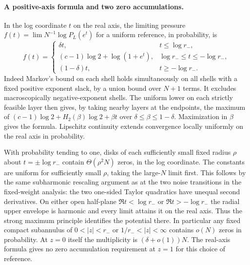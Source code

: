 \paragraph{A positive-axis formula and two zero accumulations.}
In the log coordinate $t$ on the real axis, the limiting pressure $f(t)=\lim N^{-1}\log P_L(e^t)$ for a uniform reference, in probability, is
\[
 f(t)=
 \begin{cases}
   \delta t, &t\le\log r_-,\\
   (c-1)\log2+\log(1+e^t), &\log r_-\le t\le-\log r_-,\\
   (1-\delta)t, &t\ge-\log r_- .
 \end{cases}
\]
Indeed Markov's bound on each shell holds simultaneously on all shells with a fixed positive exponent slack, by a union bound over $N+1$ terms. It excludes macroscopically negative-exponent shells. The uniform lower on each strictly feasible layer then gives, by taking nearby layers at the endpoints, the maximum of
$(c-1)\log2+H_2(\beta)\log2+\beta t$ over $\delta\le\beta\le1-\delta$. Maximization in $\beta$ gives the formula. Lipschitz continuity extends convergence locally uniformly on the real axis in probability.

With probability tending to one, disks of each sufficiently small fixed radius $\rho$ about $t=\pm\log r_-$ contain $\Theta(\rho^2 N)$ zeros, in the log coordinate. The constants are uniform for sufficiently small $\rho$, taking the large-$N$ limit first. This follows by the same subharmonic rescaling argument as at the two noise transitions in the fixed-weight analysis: the two one-sided Taylor quadratics have unequal second derivatives. On either open half-plane $\Re t<\log r_-$ or $\Re t>-\log r_-$ the radial upper envelope is harmonic and every limit attains it on the real axis. Thus the strong maximum principle identifies the potential there. In particular any fixed compact subannulus of $0<|z|<r_-$ or $1/r_-<|z|<\infty$ contains $o(N)$ zeros in probability. At $z=0$ itself the multiplicity is $(\delta+o(1))N$. The real-axis formula gives no zero accumulation requirement at $z=1$ for this choice of reference.
